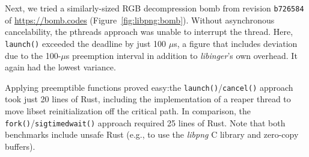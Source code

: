 Next, we tried a similarly-sized RGB decompression bomb from revision
\texttt{b726584} of \url{https://bomb.codes} (Figure~\ref{fig:libpng:bomb}).  Without
asynchronous cancelability, the pthreads approach was unable to interrupt the thread.
Here, \texttt{launch()} exceeded the deadline by just 100
$\mu$s, a figure that includes deviation due to the 100-$\mu$s preemption interval in
addition to \textit{libinger}'s own overhead.  It again had the lowest variance.

Applying preemptible functions proved easy:\@ the
\texttt{launch()}/\texttt{cancel()} approach took just 20 lines of Rust, including
the implementation of a reaper thread to move libset reinitialization off the
critical path.  In comparison, the \texttt{fork()}/\texttt{sigtimedwait()} approach
required 25 lines of Rust.  Note that both benchmarks include unsafe Rust
(e.g., to use the \textit{libpng} C library and zero-copy buffers).
